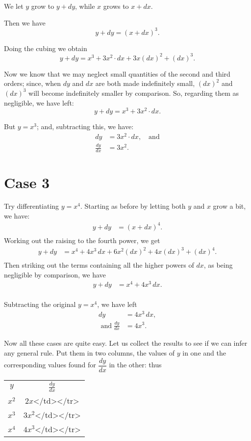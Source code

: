 \documentclass{ximera}
\begin{document}
We let $y$ grow to $y+dy$, while $x$ grows to $x+dx$.

Then we have
\[ y + dy = (x + dx)^3. \]


Doing the cubing we obtain
\[ y + dy = x^3 + 3x^2 · dx + 3x(dx)^2+(dx)^3. \]

Now we know that we may neglect small quantities of the second and third orders; since, when $dy$ and $dx$ are both made indefinitely small, $(dx)^2$ and $(dx)^3$ will become indefinitely smaller by comparison. So, regarding them as negligible, we have left:
\[ y + dy=x^3+3x^2 · dx. \]

But $y=x^3$; and, subtracting this, we have:
\begin{align*}
dy &= 3x^2 · dx, \quad \textrm{and}\\
\frac{dy}{dx} &= 3x^2.
\end{align*}

\section*{Case 3}
Try differentiating $y=x^4$. Starting as before by
letting both $y$ and $x$ grow a bit, we have:
\begin{align*}
y + dy &= (x+dx)^4.  \\
\end{align*}
Working out the raising to the fourth power, we get
\begin{align*}
y + dy &= x^4 + 4x^3\, dx + 6x^2(dx)^2 + 4x(dx)^3+(dx)^4.  \\
\end{align*}
Then striking out the terms containing all the higher powers of $dx$, as being negligible by comparison, we have
\begin{align*}
y + dy &= x^4+4x^3\, dx.  \\
\end{align*}

Subtracting the original $y=x^4$, we have left
\begin{align*}
dy &= 4x^3\, dx, \\
\text{ and}\;
\frac{dy}{dx} &= 4x^3.
\end{align*}

Now all these cases are quite easy. Let us collect the results to see if we can infer any general rule. Put them in two columns, the values of $y$ in one and the corresponding values found for $\dfrac{dy}{dx}$ in the other: thus
\begin{tabular}{cc}
$y$ & $\frac{dy}{dx}$ \\
$x^2$ & $2x$</td></tr> \\
$x^3$ & $3x^2$</td></tr> \\
$x^4$ & $4x^3$</td></tr>
\end{tabular}
\end{document}

